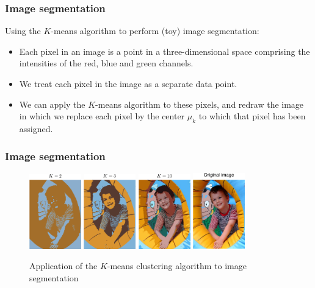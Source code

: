 \documentclass{beamer}
\begin{document}
\begin{frame}
    \frametitle{Image segmentation}
    Using the $K$-means algorithm to perform (toy) image segmentation:
    \begin{itemize}
        \item Each pixel in an image is a point in a three-dimensional space comprising the intensities of the red, blue and green channels.
        \item We treat each pixel in the image as a separate data point.
        \item We can apply the $K$-means algorithm to these pixels, and redraw the image in which we replace each pixel by the center $\mu_{k}$ to which that pixel has been assigned.
    \end{itemize}
\end{frame}

\begin{frame}
    \frametitle{Image segmentation}
    \begin{figure}
        \caption{Application of the $K$-means clustering algorithm to image segmentation}
        \includegraphics[width=0.2\textwidth]{Figure_3_a.pdf}
        \includegraphics[width=0.2\textwidth]{Figure_3_b.pdf}
        \includegraphics[width=0.2\textwidth]{Figure_3_c.pdf}
        \includegraphics[width=0.2\textwidth]{Figure_3_d.pdf}
    \end{figure}
\end{frame}
\end{document}

